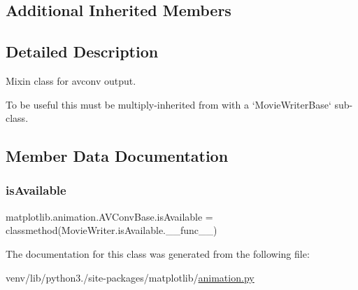 \subsection*{Additional Inherited Members}


\subsection{Detailed Description}
\begin{DoxyVerb}Mixin class for avconv output.

To be useful this must be multiply-inherited from with a
`MovieWriterBase` sub-class.
\end{DoxyVerb}
 

\subsection{Member Data Documentation}
\mbox{\label{classmatplotlib_1_1animation_1_1AVConvBase_aeaa6b80f14797d64dd3c55f883e99db9}} 
\subsubsection{\texorpdfstring{is\+Available}{isAvailable}}
{\footnotesize\ttfamily matplotlib.\+animation.\+A\+V\+Conv\+Base.\+is\+Available = classmethod(Movie\+Writer.\+is\+Available.\+\_\+\+\_\+func\+\_\+\+\_\+)\hspace{0.3cm}{\ttfamily [static]}}



The documentation for this class was generated from the following file\+:\begin{DoxyCompactItemize}
\item 
venv/lib/python3./site-\/packages/matplotlib/\hyperlink{animation_8py}{animation.\+py}\end{DoxyCompactItemize}
